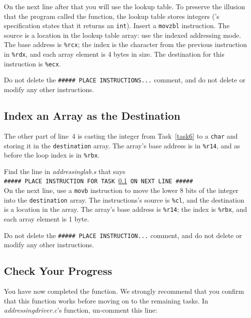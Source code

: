 On the next line after that you will use the  lookup table.
To preserve the illusion that the program called the 
function, the lookup table stores integers ('s specification
states that it returns an \lstinline{int}). Insert a \lstinline{movzbl}
instruction. The source is a location in the lookup table array: use the indexed
addressing mode. The base address is \lstinline{%rcx}; the index is the
character from the previous instruction in \lstinline{%rdx}, and each array
element is 4 bytes in size. The destination for this instruction is
\lstinline{%ecx}.


Do not delete the \texttt{\#\#\#\#\# PLACE INSTRUCTIONS...} comment, and do not
delete or modify any other instructions.

\subsection{Index an Array as the Destination}\label{task7}

The other part of line~4 is casting the integer from Task~\ref{task6} to a
\lstinline{char} and storing it in the \lstinline{destination} array. The
array's base address is in \lstinline{%r14}, and as before the loop index is in
\lstinline{%rbx}.

Find the line in \textit{addressinglab.s} that says \\
\texttt{\#\#\#\#\# PLACE INSTRUCTION FOR TASK \ref{task7} ON NEXT LINE \#\#\#\#\#} \\
On the next line, use a \lstinline{movb} instruction to move the lower 8 bits
of the integer into the \lstinline{destination} array. The instructions's
source is \lstinline{%cl}, and the destination is a location in the array. The
array's base address is \lstinline{%r14}; the index is \lstinline{%rbx}, and
each array element is 1 byte.


Do not delete the \texttt{\#\#\#\#\# PLACE INSTRUCTION...} comment, and do not
delete or modify any other instructions.

\subsection*{Check Your Progress}

You have now completed the  function. We
strongly recommend that you confirm that this function works before moving on
to the remaining tasks. In \textit{addressingdriver.c}'s 
function, un-comment this line:

